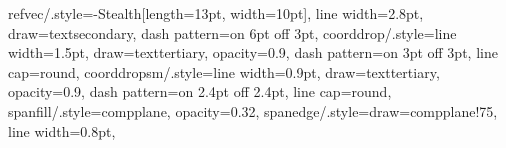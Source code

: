{  %
  refvec/.style={-{Stealth[length=13pt, width=10pt]}, line width=2.8pt, draw=textsecondary,
    dash pattern=on 6pt off 3pt},
  coorddrop/.style={line width=1.5pt, draw=texttertiary, opacity=0.9,
    dash pattern=on 3pt off 3pt, line cap=round},
  coorddropsm/.style={line width=0.9pt, draw=texttertiary, opacity=0.9,
    dash pattern=on 2.4pt off 2.4pt, line cap=round},
  spanfill/.style={compplane, opacity=0.32},
  spanedge/.style={draw=compplane!75, line width=0.8pt},
}
